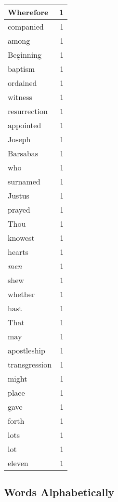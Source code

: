 \begin{center}
\begin{longtable}{l|r}
Wherefore & 1 \\ \hline
companied & 1 \\ \hline
among & 1 \\ \hline
Beginning & 1 \\ \hline
baptism & 1 \\ \hline
ordained & 1 \\ \hline
witness & 1 \\ \hline
resurrection & 1 \\ \hline
appointed & 1 \\ \hline
Joseph & 1 \\ \hline
Barsabas & 1 \\ \hline
who & 1 \\ \hline
surnamed & 1 \\ \hline
Justus & 1 \\ \hline
prayed & 1 \\ \hline
Thou & 1 \\ \hline
knowest & 1 \\ \hline
hearts & 1 \\ \hline
\emph{men} & 1 \\ \hline
shew & 1 \\ \hline
whether & 1 \\ \hline
hast & 1 \\ \hline
That & 1 \\ \hline
may & 1 \\ \hline
apostleship & 1 \\ \hline
transgression & 1 \\ \hline
might & 1 \\ \hline
place & 1 \\ \hline
gave & 1 \\ \hline
forth & 1 \\ \hline
lots & 1 \\ \hline
lot & 1 \\ \hline
eleven & 1 \\ \hline
\end{longtable}
\end{center}



\normalsize



\subsection{Words Alphabetically}

